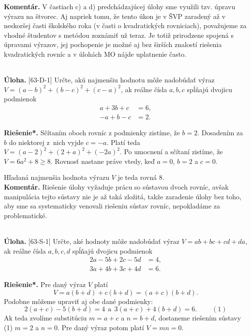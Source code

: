 \documentclass[11pt,a4paper,oneside,final]{book}
\newcommand{\kom}{\textbf{Komentár.} }
\newcommand{\ul}{\textbf{Úloha.} }
\newcommand{\rieh}{\textbf{Riešenie*.} }
\begin{document}
\kom V častiach c) a d) predchádzajúcej úlohy sme využili tzv. úpravu výrazu na štvorec. Aj napriek tomu, že tento úkon je v ŠVP zaradený až v neskoršej časti školského roka (v časti o kvadratických rovniciach), považujeme za vhodné študentov s metódou zoznámiť už teraz. Je totiž prirodzene spojená s úpravami výrazov, jej pochopenie je možné aj bez širších znalostí riešenia kvadratických rovníc a v úlohách MO nájde uplatnenie často. \\
\\
\begin{tcolorbox}[breakable,notitle,boxrule=0pt,colback=light-gray,colframe=light-gray]\ul [63-D-1] Určte, akú najmenšiu hodnotu môže nadobúdať výraz $V = (a-b)^2 +(b-c)^2 +(c-a)^2$, ak reálne čísla $a, b, c$ spĺňajú dvojicu podmienok
\begin{align*}
a + 3b + c &= 6,\\
-a + b - c &= 2.
\end{align*}

\end{tcolorbox}

\rieh Sčítaním oboch rovníc z podmienky zistíme, že $b = 2$. Dosadením za $b$ do niektorej z~nich vyjde $c = -a$. Platí teda $V = (a - 2)^2 + (2 + a)^2 + (-2a)^2$. Po umocnení a sčítaní zistíme, že $V = 6a^2 + 8 \geq 8$. Rovnosť nastane práve vtedy, keď $a = 0$, $b = 2$ a $c = 0$.

Hľadaná najmenšia hodnota výrazu $V$ je teda rovná 8.\\

\kom Riešenie úlohy vyžaduje prácu so sústavou dvoch rovníc, avšak manipulácia tejto sústavy nie je až taká zložitá, takže zaradenie úlohy bez toho, aby sme sa systematicky venovali riešeniu sústav rovníc, nepokladáme za problematické.\\
\\
\begin{tcolorbox}[breakable,notitle,boxrule=0pt,colback=light-gray,colframe=light-gray]\ul [63-S-1] Určte, aké hodnoty môže nadobúdať výraz $V = ab + bc + cd + da$, ak reálne čísla $a,b, c, d$ spĺňajú dvojicu podmienok
\begin{align*}
2a - 5b + 2c - 5d &= 4,\\
3a + 4b + 3c + 4d &= 6.
\end{align*}
\end{tcolorbox}

\rieh Pre daný výraz $V$ platí $$V = a(b + d) + c(b + d) = (a + c)(b + d).$$
Podobne môžeme upraviť aj obe dané podmienky: $$2(a + c) - 5(b + d) = 4 \ \ \mathrm{a} \ \  3(a + c) + 4(b + d) = 6.\ \ \  \ \ \ \ \ \ \ (1)$$
Ak teda zvolíme substitúciu $m = a + c$ a $n = b + d$, dostaneme riešením sústavy (1) $m = 2$ a $n = 0$. Pre daný výraz potom platí $V = mn = 0$.
\end{document}
